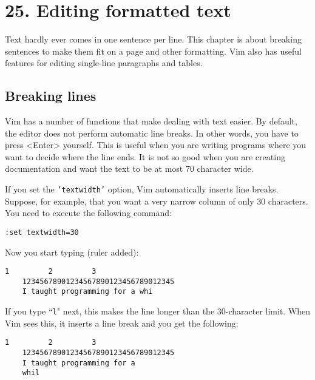 \section{25. Editing formatted text}
Text hardly ever comes in one sentence per line.
This chapter is about breaking sentences to make them fit on a page and other formatting.
Vim also has useful features for editing single-line paragraphs and tables.
\subsection{Breaking lines}
\localtableofcontents
Vim has a number of functions that make dealing with text easier.
By default, the editor does not perform automatic line breaks.
In other words, you have to press <Enter> yourself.
This is useful when you are writing programs where you want to decide where the line ends.
It is not so good when you are creating documentation and want the text to be at most 70 character wide.

If you set the \texttt{'textwidth'} option, Vim automatically inserts line breaks.
Suppose, for example, that you want a very narrow column of only 30 characters.
You need to execute the following command:

\begin{Verbatim}[samepage=true]
 :set textwidth=30
\end{Verbatim}

Now you start typing (ruler added):

\begin{Verbatim}[samepage=true]
             1         2         3
    12345678901234567890123456789012345
    I taught programming for a whi
\end{Verbatim}

If you type ``\texttt{l}" next, this makes the line longer than the 30-character limit.
When Vim sees this, it inserts a line break and you get the following:

\begin{Verbatim}[samepage=true]
             1         2         3
    12345678901234567890123456789012345
    I taught programming for a
    whil
\end{Verbatim}

